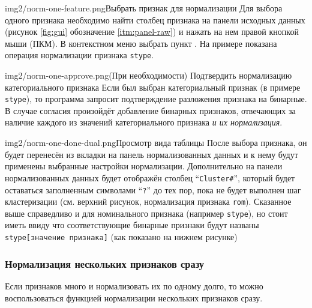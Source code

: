 \documentclass[12pt,tikz]{instruction}
\begin{document}
\begin{steps}
	\begin{ist}{img2/norm-one-feature.png}{Выбрать признак для нормализации}
		Для выбора одного признака необходимо найти столбец признака на панели исходных данных (рисунок \ref{fig:gui} обозначение 	\ref{itm:panel-raw}) и нажать на нем правой кнопкой мыши (ПКМ). В контекстном меню выбрать пункт . На примере показана операция нормализации признака \texttt{stype}.
	\end{ist}
	
	\begin{ist}{img2/norm-one-approve.png}{(При необходимости) Подтвердить нормализацию категориального признака}
		Если был выбран категориальный признак (в примере \texttt{stype}), то программа запросит подтверждение разложения признака на бинарные. В случае согласия произойдёт добавление бинарных признаков, отвечающих за наличие каждого из значений категориального признака \textit{ и их нормализация}.
	\end{ist}
		
	\begin{ist}{img2/norm-one-done-dual.png}{Просмотр вида таблицы}
		После выбора признака, он будет перенесён из вкладки на панель нормализованных данных и к нему будут применены выбранные настройки нормализации. Дополнительно на панели нормализованных данных будет отображён столбец ``\texttt{Cluster\#}'', который будет оставаться заполненным символами ``\texttt{?}'' до тех пор, пока не будет выполнен шаг кластеризации (см. верхний рисунок, нормализация признака \texttt{rom}). Сказанное выше справедливо и для номинального признака (например \texttt{stype}), но стоит иметь ввиду что соответствующие бинарные признаки будут названы \texttt{stype[значение признака]} (как показано на нижнем рисунке)
	\end{ist}
		
\end{steps}

\newpage
\subsubsection{Нормализация нескольких признаков сразу}

Если признаков много и нормализовать их по одному долго, то можно воспользоваться функцией нормализации нескольких признаков сразу.
\end{document}
